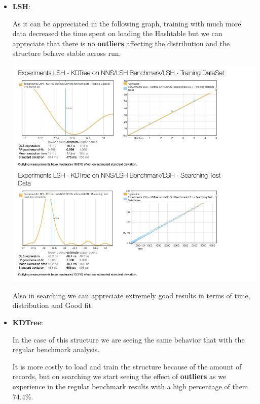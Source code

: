 \documentclass[12pt, a4paper]{article}
\begin{document}
\begin{itemize}
  \item \textbf{LSH}:

    As it can be appreciated in the following graph, training with much more data decreased the time spent on loading the Hashtable but we can appreciate that there is no \textbf{outliers} affecting the distribution and the structure behave stable across run.

\begin{minipage}[t]{\linewidth}
  \includegraphics[width=\textwidth]{random_bench_lsh}
  \captionsetup{type=figure}
  \label{fig:random_bench_lsh}
\end{minipage}

Also in searching we can appreciate extremely good results in terms of time, distribution and Good fit.

  \item \textbf{KDTree}:

In the case of this structure we are seeing the same behavior that with the regular benchmark analysis.

It is more costly to load and train the structure because of the amount of records, but on searching we start seeing the effect of \textbf{outliers} as we experience in the regular benchmark results with a high percentage of them $74.4\%$.


\end{itemize}
\end{document}
